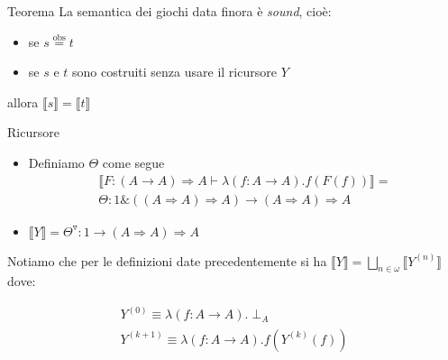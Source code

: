 \documentclass{beamer}
\newcommand{\eqobs}{\stackrel{\text{obs}}{=}}
\begin{document}
\begin{frame}
	
	\begin{block}{Teorema}
		La semantica dei giochi data finora è \emph{sound}, cioè:
		\begin{itemize}
			\item se $s \eqobs t$
			\item se $s$ e $t$ sono costruiti senza usare il ricursore $Y$
		\end{itemize}
  allora $\llbracket s \rrbracket = 
	\llbracket t \rrbracket$
	\end{block}

	
\end{frame}









\begin{frame}
	
	\begin{block}{Ricursore}
	
		\begin{itemize}
			\item Definiamo $\Theta$ come segue
			\begin{gather*}
				\llbracket F: (A \rightarrow A) \Rightarrow A \vdash \lambda (f : A \rightarrow A).f(F(f)) \rrbracket = \\
				\Theta:1\&((A\Rightarrow A) \Rightarrow A) \rightarrow (A\Rightarrow A) \Rightarrow A
			\end{gather*}
			\item $\llbracket Y \rrbracket = \Theta ^\triangledown : 1 \rightarrow (A\Rightarrow A) \Rightarrow A$
		\end{itemize}
		
	\end{block}
	
	Notiamo che per le definizioni date precedentemente si ha $\llbracket Y \rrbracket = \bigsqcup_{n\in \omega} \llbracket Y^{(n)} \rrbracket$ dove:
	
	\begin{gather*}
		Y^{(0)} \equiv \lambda(f: A \rightarrow A).\perp_A \\
		Y^{(k+1)} \equiv \lambda(f : A\rightarrow A).f(Y^{(k)}(f))
	\end{gather*}


	
\end{frame}
\end{document}
